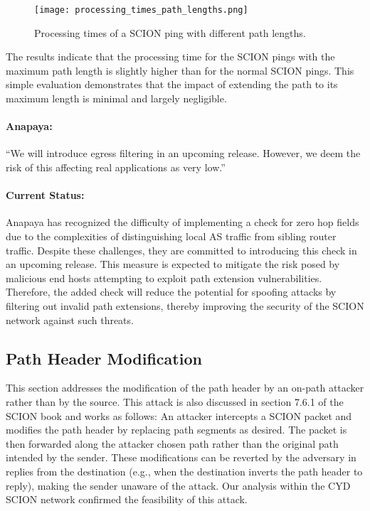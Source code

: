 \begin{figure}[h]
    \centering
    \texttt{[image: processing\_times\_path\_lengths.png]}
    \caption{Processing times of a SCION ping with different path lengths.}
    \label{fig:path_extension}
\end{figure}

The results indicate that the processing time for the SCION pings with the maximum path length is slightly higher than for the normal SCION pings.
This simple evaluation demonstrates that the impact of extending the path to its maximum length is minimal and largely negligible.


\begin{boxH}
    \paragraph{Anapaya:}
    ``We will introduce egress filtering in an upcoming release.
    However, we deem the risk of this affecting real applications as very low.''
\end{boxH}

\paragraph{Current Status:}
Anapaya has recognized the difficulty of implementing a check for zero hop fields due to the complexities of distinguishing local AS traffic from sibling router traffic.
Despite these challenges, they are committed to introducing this check in an upcoming release.
This measure is expected to mitigate the risk posed by malicious end hosts attempting to exploit path extension vulnerabilities.
Therefore, the added check will reduce the potential for spoofing attacks by filtering out invalid path extensions, thereby improving the security of the SCION network against such threats.

\subsection{Path Header Modification}
\label{sec:path-header-modification}
This section addresses the modification of the path header by an on-path attacker rather than by the source.
This attack is also discussed in section 7.6.1 of the SCION book \cite{Perrig2022} and works as follows:
An attacker intercepts a SCION packet and modifies the path header by replacing path segments as desired.
The packet is then forwarded along the attacker chosen path rather than the original path intended by the sender.
These modifications can be reverted by the adversary in replies from the destination (e.g., when the destination inverts the path header to reply), making the sender unaware of the attack.
Our analysis within the CYD SCION network confirmed the feasibility of this attack.

